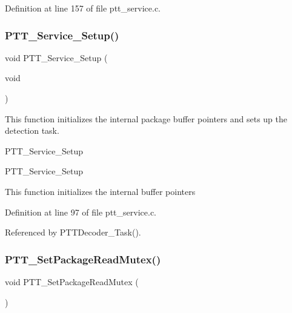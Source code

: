Definition at line 157 of file ptt\+\_\+service.\+c.

\mbox{\label{group___p_t_t___service_gad7d3c7ba934966d4834e6609db4c13a6}} 
\subsubsection{\texorpdfstring{P\+T\+T\+\_\+\+Service\+\_\+\+Setup()}{PTT\_Service\_Setup()}}
{\footnotesize\ttfamily void P\+T\+T\+\_\+\+Service\+\_\+\+Setup (\begin{DoxyParamCaption}\item[{void}]{ }\end{DoxyParamCaption})}



This function initializes the internal package buffer pointers and sets up the detection task. 

P\+T\+T\+\_\+\+Service\+\_\+\+Setup

P\+T\+T\+\_\+\+Service\+\_\+\+Setup

This function initializes the internal buffer pointers 

Definition at line 97 of file ptt\+\_\+service.\+c.



Referenced by P\+T\+T\+Decoder\+\_\+\+Task().

\mbox{\label{group___p_t_t___service_ga82a1eaef3ef13fdfe4f6f5202344911b}} 
\subsubsection{\texorpdfstring{P\+T\+T\+\_\+\+Set\+Package\+Read\+Mutex()}{PTT\_SetPackageReadMutex()}}
{\footnotesize\ttfamily void P\+T\+T\+\_\+\+Set\+Package\+Read\+Mutex (\begin{DoxyParamCaption}{ }\end{DoxyParamCaption})}



